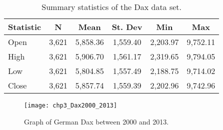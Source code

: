 


\begin{table}[!htbp] \centering
\caption[Dax summary statistics]{Summary statistics of the Dax data set.}
\label{tab:daxsum}
\begin{tabular}{lccccc}
\toprule
Statistic & N & Mean & St. Dev & Min & Max \\
\midrule
Open  & 3,621 & 5,858.36 & 1,559.40 & 2,203.97 & 9,752.11 \\
High  & 3,621 & 5,906.70 & 1,561.17 & 2,319.65 & 9,794.05 \\
Low   & 3,621 & 5,804.85 & 1,557.49 & 2,188.75 & 9,714.02 \\
Close & 3,621 & 5,857.74 & 1,559.39 & 2,202.96 & 9,742.96 \\
\bottomrule
\end{tabular}
\end{table}


\begin{figure}[tbph]
\centering
\texttt{[image: chp3\_Dax2000\_2013]}
\caption[Graph of Dax between 2000 and 2013]{Graph of German Dax between 2000 and 2013.}
\label{fig:Dax2000_2013}
\end{figure}

